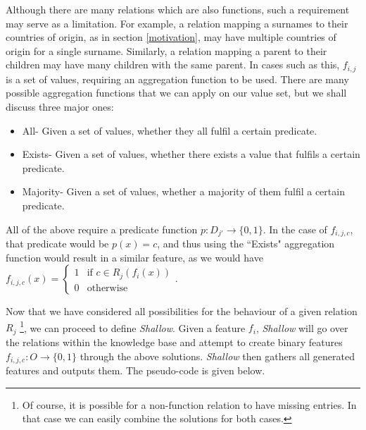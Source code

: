 \documentclass[twoside,11pt]{article}
\theoremstyle{definition}
\begin{document}
Although there are many relations which are also functions, such a requirement may serve as a limitation. For example, a relation mapping a surnames to their countries of origin, as in section \ref{motivation}, may have multiple countries of origin for a single surname. Similarly, a relation mapping a parent to their children may have many children with the same parent.
In cases such as this, $f_{i,j}$ is a set of values, requiring an aggregation function to be used. There are many possible aggregation functions that we can apply on our value set, but we shall discuss three major ones:
\begin{itemize}
	\item All- Given a set of values, whether they all fulfil a certain predicate.
	\item Exists- Given a set of values, whether there exists a value that fulfils a certain predicate.
	\item Majority- Given a set of values, whether a majority of them fulfil a certain predicate.
\end{itemize}
All of the above require a predicate function $p:D_{j'}\rightarrow \{0,1\}$. In the case of $f_{i,j,c}$, that predicate would be $p(x)=c$, and thus using the ``Exists" aggregation function would result in a similar feature, as we would have $f_{i,j,c}(x)=\begin{cases} 1 &\mbox{if } c\in R_j(f_i(x))\\ 
0 & \mbox{otherwise } \end{cases}$.

Now that we have considered all possibilities for the behaviour of a given relation $R_j$ \footnote{Of course, it is possible for a non-function relation to have missing entries. In that case we can easily combine the solutions for both cases.}, we can proceed to define \emph{Shallow}. Given a feature $f_i$, \emph{Shallow} will go over the relations within the knowledge base and attempt to create binary features $f_{i,j,c}:O\rightarrow \{0,1\}$ through the above solutions. \emph{Shallow} then gathers all generated features and outputs them. The pseudo-code is given below.

\end{document}
